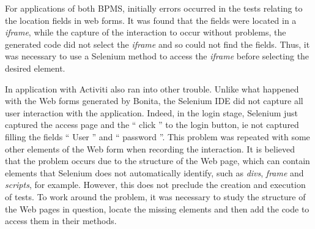 \documentclass[runningheads,a4paper]{llncs}
\begin{document}
{For applications of both BPMS, initially errors occurred in the tests relating to the location fields in web forms. It was found that the fields were located in a \emph{iframe}, while the capture of the interaction to occur without problems, the generated code did not select the \emph{iframe} and so could not find the fields. Thus, it was necessary to use a Selenium method to access the \emph{iframe} before selecting the desired element.


In application with Activiti also ran into other trouble. Unlike what happened with the Web forms generated by Bonita, the Selenium IDE did not capture all user interaction with the application. Indeed, in the login stage, Selenium just captured the access page and the `` click '' to the login button, ie not captured filling the fields `` User '' and `` password ''. This problem was repeated with some other elements of the Web form when recording the interaction. It is believed that the problem occurs due to the structure of the Web page, which can contain elements that Selenium does not automatically identify, such as \emph{divs}, \emph{frame} and \emph{scripts}, for example. However, this does not preclude the creation and execution of tests. To work around the problem, it was necessary to study the structure of the Web pages in question, locate the missing elements and then add the code to access them in their methods.

}
\end{document}
